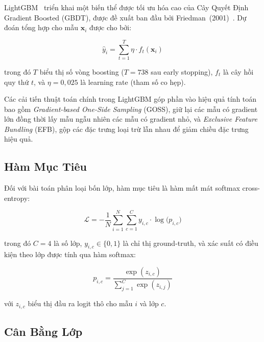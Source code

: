 \documentclass[a4paper,12pt]{article}
\begin{document}
LightGBM~\cite{lightgbm} triển khai một biến thể được tối ưu hóa cao của Cây Quyết Định Gradient Boosted (GBDT), được đề xuất ban đầu bởi Friedman~(2001)~\cite{friedman}. Dự đoán tổng hợp cho mẫu $\mathbf{x}_i$ được cho bởi:

\begin{equation}
\hat{y}_i = \sum_{t=1}^{T} \eta \cdot f_t(\mathbf{x}_i)
\label{eq:gbdt}
\end{equation}

\noindent trong đó $T$ biểu thị số vòng boosting ($T = 738$ sau early stopping), $f_t$ là cây hồi quy thứ $t$, và $\eta = 0,025$ là learning rate (tham số co hẹp).

Các cải tiến thuật toán chính trong LightGBM góp phần vào hiệu quả tính toán bao gồm \textit{Gradient-based One-Side Sampling} (GOSS), giữ lại các mẫu có gradient lớn đồng thời lấy mẫu ngẫu nhiên các mẫu có gradient nhỏ, và \textit{Exclusive Feature Bundling} (EFB), gộp các đặc trưng loại trừ lẫn nhau để giảm chiều đặc trưng hiệu quả.

\subsection{Hàm Mục Tiêu}

Đối với bài toán phân loại bốn lớp, hàm mục tiêu là hàm mất mát softmax cross-entropy:

\begin{equation}
\mathcal{L} = -\frac{1}{N}\sum_{i=1}^{N}\sum_{c=1}^{C} y_{i,c} \cdot \log\bigl(p_{i,c}\bigr)
\label{eq:loss}
\end{equation}

\noindent trong đó $C = 4$ là số lớp, $y_{i,c} \in \{0, 1\}$ là chỉ thị ground-truth, và xác suất có điều kiện theo lớp được tính qua hàm softmax:

\begin{equation}
p_{i,c} = \frac{\exp(z_{i,c})}{\sum_{j=1}^{C} \exp(z_{i,j})}
\label{eq:softmax}
\end{equation}

\noindent với $z_{i,c}$ biểu thị đầu ra logit thô cho mẫu $i$ và lớp $c$.

\subsection{Cân Bằng Lớp}
\end{document}
